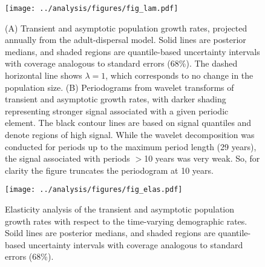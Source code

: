 \documentclass[11pt]{article}
\begin{document}
\newpage{}
\begin{figure}
\centering
\texttt{[image: ../analysis/figures/fig\_lam.pdf]}
\caption{\label{fig:lam}
(A) Transient and asymptotic population growth rates,
projected annually from the adult-dispersal model.
Solid lines are posterior medians,
and shaded regions are quantile-based uncertainty intervals
with coverage analogous to standard errors (68\%).
The dashed horizontal line shows $\lambda=1$, 
which corresponds to no change in the population size.
(B) Periodograms from wavelet transforms of transient and asymptotic growth rates,
with darker shading representing stronger signal associated with a given periodic element.
The black contour lines are based on signal quantiles and denote regions of high signal.
While the wavelet decomposition was conducted for periods up to the maximum period length
(29 years), the signal associated with periods $>$10 years was very weak. 
So, for clarity the figure truncates the periodogram at 10 years.
}
\end{figure}
\clearpage{}

\newpage{}
\begin{figure}
\centering
\texttt{[image: ../analysis/figures/fig\_elas.pdf]}
\caption{\label{fig:elas}
Elasticity analysis of the transient and asymptotic population growth rates 
with respect to the time-varying demographic rates.
Soild lines are posterior medians,
and shaded regions are quantile-based uncertainty intervals
with coverage analogous to standard errors (68\%).
}
\end{figure}
\clearpage{}
\end{document}
